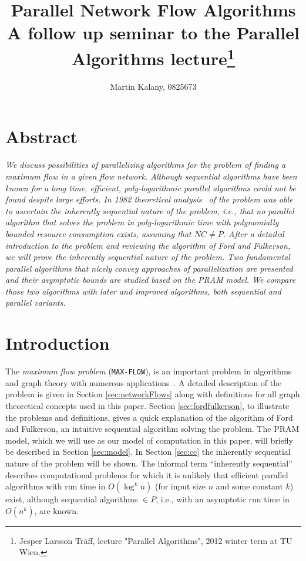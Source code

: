 \documentclass[a4paper,10pt, twocolumn]{article}
\title{Parallel Network Flow Algorithms \\ 
\large A follow up seminar to the Parallel Algorithms lecture\footnote{Jesper Larsson Träff, lecture "Parallel Algorithms", 2012 winter term at TU Wien.}}
\author{Martin Kalany, 0825673}
\begin{document}
\maketitle

\section{Abstract}
\label{sec:abstract}
\textit{We discuss possibilities of parallelizing algorithms for the problem of finding a maximum flow in a given flow network. Although sequential algorithms have been known for a long time, efficient, poly-logarithmic parallel algorithms could not be found despite large efforts. In 1982 theoretical analysis~\cite{Goldschlager82} of the problem was able to ascertain the inherently sequential nature of the problem, i.e., that no parallel algorithm that solves the problem in poly-logarithmic time with polynomially bounded resource consumption exists, assuming that $NC \neq P$. After a detailed introduction to the problem and reviewing the algorithm of Ford and Fulkerson, we will prove the inherently sequential nature of the problem. Two fundamental parallel algorithms that nicely convey approaches of parallelization are presented and their asymptotic bounds are studied based on the PRAM model. We compare those two algorithms with later and improved algorithms, both sequential and parallel variants.}


\section{Introduction}
\label{sec:intro}
The \emph{maximum flow problem} (\lstinline|MAX-FLOW|), is an important problem in algorithms and graph theory with numerous applications~\cite{ahuja93}. A detailed description of the problem is given in Section \ref{sec:networkFlows} along with definitions for all graph theoretical concepts used in this paper. Section \ref{sec:fordfulkerson}, to illustrate the problems and definitions, gives a quick explanation of the algorithm of Ford and Fulkerson, an intuitive sequential algorithm solving the problem. The PRAM model, which we will use as our model of computation in this paper, will briefly be described in Section \ref{sec:model}. In Section \ref{sec:cc} the inherently sequential nature of the problem will be shown. The informal term ``inherently sequential'' describes computational problems for which it is unlikely that efficient parallel algorithms with run time in $O(\log^{k}n)$ (for input size $n$ and some constant $k$) exist, although sequential algorithms $\in P$, i.e., with an asymptotic run time in $O(n^{k})$, are known.
\end{document}

